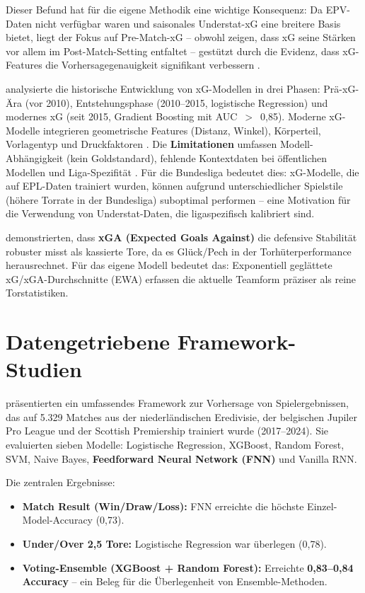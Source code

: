 Dieser Befund hat für die eigene Methodik eine wichtige Konsequenz: Da EPV-Daten nicht verfügbar waren und saisonales Understat-xG \cite{Understat2024} eine breitere Basis bietet, liegt der Fokus auf Pre-Match-xG -- obwohl \textcite{ForcherEtAl2025} zeigen, dass xG seine Stärken vor allem im Post-Match-Setting entfaltet -- gestützt durch die Evidenz, dass xG-Features die Vorhersagegenauigkeit signifikant verbessern \cite{AnzerBauer2021,VanEetveldeEtAl2024}.

\textcite{Wheatcroft2022} analysierte die historische Entwicklung von xG-Modellen in drei Phasen: Prä-xG-Ära (vor 2010), Entstehungsphase (2010--2015, logistische Regression) und modernes xG (seit 2015, Gradient Boosting mit AUC~$>$~0,85). Moderne xG-Modelle integrieren geometrische Features (Distanz, Winkel), Körperteil, Vorlagentyp und Druckfaktoren \cite{AnzerBauer2021,BauerEpstein2023}. Die \textbf{Limitationen} umfassen Modell-Abhängigkeit (kein Goldstandard), fehlende Kontextdaten bei öffentlichen Modellen und Liga-Spezifität \cite{Wheatcroft2022}. Für die Bundesliga bedeutet dies: xG-Modelle, die auf EPL-Daten trainiert wurden, können aufgrund unterschiedlicher Spielstile (höhere Torrate in der Bundesliga) suboptimal performen -- eine Motivation für die Verwendung von Understat-Daten, die ligaspezifisch kalibriert sind.

\textcite{VanEetveldeEtAl2024} demonstrierten, dass \textbf{xGA (Expected Goals Against)} die defensive Stabilität robuster misst als kassierte Tore, da es Glück/Pech in der Torhüterperformance herausrechnet. Für das eigene Modell bedeutet das: Exponentiell geglättete xG/xGA-Durchschnitte (EWA) erfassen die aktuelle Teamform präziser als reine Torstatistiken.

\section{Datengetriebene Framework-Studien}
\label{sec:data-driven-frameworks}

\textcite{MillsEtAl2024} präsentierten ein umfassendes Framework zur Vorhersage von Spielergebnissen, das auf 5.329 Matches aus der niederländischen Eredivisie, der belgischen Jupiler Pro League und der Scottish Premiership trainiert wurde (2017--2024). Sie evaluierten sieben Modelle: Logistische Regression, XGBoost, Random Forest, SVM, Naive Bayes, \textbf{Feedforward Neural Network (FNN)} und Vanilla RNN.

Die zentralen Ergebnisse:
\begin{itemize}
    \item \textbf{Match Result (Win/Draw/Loss):} FNN erreichte die höchste Einzel-Model-Accuracy (0,73).
    \item \textbf{Under/Over 2,5 Tore:} Logistische Regression war überlegen (0,78).
    \item \textbf{Voting-Ensemble (XGBoost + Random Forest):} Erreichte \textbf{0,83--0,84 Accuracy} -- ein Beleg für die Überlegenheit von Ensemble-Methoden.
\end{itemize}

